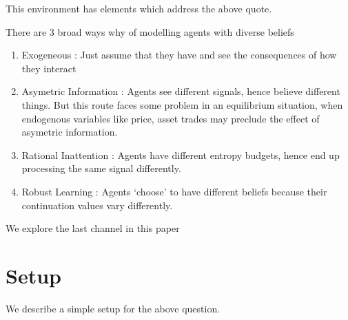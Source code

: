 \documentclass[a4paper,12pt]{article}
\begin{document}
\noindent This environment has elements which address the above quote.

There are 3 broad ways why of modelling agents with diverse beliefs
\begin{enumerate}
	\item Exogeneous : Just assume that they have and see the consequences of how they interact
	\item Asymetric Information : Agents see different signals, hence believe different things. But this route faces some problem in an equilibrium situation, when endogenous variables like price, asset trades may preclude the effect of asymetric information.
	\item Rational Inattention : Agents have different entropy budgets, hence end up processing the same signal differently. 
	\item Robust Learning : Agents `choose' to have different beliefs because their continuation values vary differently. 
\end{enumerate}
We explore the last channel in this paper

\section{Setup}
\noindent We describe  a simple setup for the above question.
\end{document}
